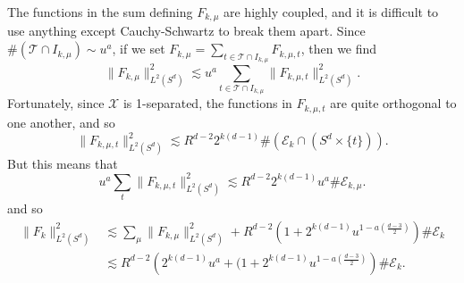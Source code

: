 \documentclass[dvipsnames,letterpaper,12pt]{article}
\begin{document}
\begin{comment}
    \item For $l > 2(\mu - \mu')$, if $(x_1,t_1) \in \mathcal{H}_{x_0,t_0,l}$, then $x_1$ lies in a geodesic annulus with thickness $O(u^a/R)$ and radius $\gtrsim l u^a / R$, centered at $x_0$. Thus $\mathcal{H}_{x_0,t_0,l}$ is covered by $O(l^{d-1})$ balls of radius $u^a / R$. The density properties of $\mathcal{E}_k$ imply that
    \[ \# \mathcal{H}_{x_0,t_0,l} \lesssim (Ru) l^{d-1} (u^a/R) = u^{a+1} l^{d-1}. \]
    Together with Lemma \ref{mainOrthogonalityLemma}, we conclude that
    \[ \sum_{(x_1,t_1) \in \mathcal{H}_{x_0,t_0,l}} |\langle {S\!}_{x_0,t_0}, {S\!}_{x_1,t_1} \rangle| \lesssim_M (u^{a+1} l^{d-1}) (l u^a)^{-M}. \]
    Picking $M \gtrsim d$ and summing over $l > 2 (\mu - \mu')$, $\mu' \leq \mu - 10$, and $(x_0,t_0) \in \mathcal{E}_{k,\mu}$ gives that
    \[ \sum_{(x_0,t_0) \in \mathcal{E}_{k,\mu}} \sum_{\mu' \leq \mu - 10} \sum_{(\mu - \mu')/2 \leq l} \sum_{(x_1,t_1) \in \mathcal{H}_{x_0,t_0,l}} |\langle {S\!}_{x_0,t_0}, {S\!}_{x_1,t_1} \rangle| \lesssim \# \mathcal{E}_{k,\mu}. \]
\end{itemize}
%
Thus we have, using that $\mu \lesssim 2^k / u^a$, we conclude that
%
\begin{align*}
    \| F_k \|_{L^2(S^d)}^2 &\lesssim \sum_\mu \| F_{k,\mu} \|_{L^2(S^d)}^2 + \sum_\mu \left( 1 + u^{1 - a \left( \frac{d-3}{2} \right)} \mu^{\frac{d+1}{2}} \right) \# \mathcal{E}_{k,\mu}\\
    &= \sum_\mu \| F_{k,\mu} \|_{L^2(S^d)}^2 + \left( 1 + 2^{k \frac{d+1}{2}} u^{1 - a (d-1)} \right) \# \mathcal{E}_k.
\end{align*}
%
\end{comment}
The functions in the sum defining $F_{k,\mu}$ are highly coupled, and it is difficult to use anything except Cauchy-Schwartz to break them apart. Since $\# ( \mathcal{T} \cap I_{k,\mu}) \sim u^a$, if we set $F_{k,\mu} = \sum_{t \in \mathcal{T} \cap I_{k,\mu}} F_{k,\mu,t}$, then we find
%
\[ \| F_{k,\mu} \|_{L^2(S^d)}^2 \lesssim u^a \sum_{t \in \mathcal{T} \cap I_{k,\mu}} \| F_{k,\mu,t} \|_{L^2(S^d)}^2. \]
%
Fortunately, since $\mathcal{X}$ is 1-separated, the functions in $F_{k,\mu,t}$ are quite orthogonal to one another, and so
%
\[ \| F_{k,\mu,t} \|_{L^2(S^d)}^2 \lesssim R^{d-2} 2^{k(d-1)} \# (\mathcal{E}_k \cap (S^d \times \{ t \})). \]
%
But this means that
%
\[ u^a \sum_t \| F_{k,\mu,t} \|_{L^2(S^d)}^2 \lesssim R^{d-2} 2^{k(d-1)} u^a \# \mathcal{E}_{k,\mu}. \]
%
and so
%
\begin{align*}
    \| F_k \|_{L^2(S^d)}^2 &\lesssim \sum_\mu \| F_{k,\mu} \|_{L^2(S^d)}^2 + R^{d-2} \left( 1 + 2^{k(d-1)} u^{1 - a \left( \frac{d-3}{2} \right)} \right) \# \mathcal{E}_k\\
    &\lesssim R^{d-2} \left( 2^{k(d-1)} u^a + (1 + 2^{k(d-1)} u^{1 - a \left( \frac{d-3}{2} \right)} \right) \# \mathcal{E}_k.
\end{align*}
\end{document}
